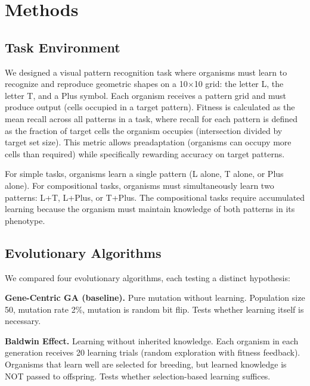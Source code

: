 \documentclass[twocolumn]{nature}
\begin{document}

\section*{Methods}

\subsection*{Task Environment}

We designed a visual pattern recognition task where organisms must learn to recognize and reproduce geometric shapes on a 10$\times$10 grid: the letter L, the letter T, and a Plus symbol. Each organism receives a pattern grid and must produce output (cells occupied in a target pattern). Fitness is calculated as the mean recall across all patterns in a task, where recall for each pattern is defined as the fraction of target cells the organism occupies (intersection divided by target set size). This metric allows preadaptation (organisms can occupy more cells than required) while specifically rewarding accuracy on target patterns.

For simple tasks, organisms learn a single pattern (L alone, T alone, or Plus alone). For compositional tasks, organisms must simultaneously learn two patterns: L+T, L+Plus, or T+Plus. The compositional tasks require accumulated learning because the organism must maintain knowledge of both patterns in its phenotype.

\subsection*{Evolutionary Algorithms}

We compared four evolutionary algorithms, each testing a distinct hypothesis:

\textbf{Gene-Centric GA (baseline).} Pure mutation without learning. Population size 50, mutation rate 2\%, mutation is random bit flip. Tests whether learning itself is necessary.

\textbf{Baldwin Effect.} Learning without inherited knowledge. Each organism in each generation receives 20 learning trials (random exploration with fitness feedback). Organisms that learn well are selected for breeding, but learned knowledge is NOT passed to offspring. Tests whether selection-based learning suffices.
\end{document}
